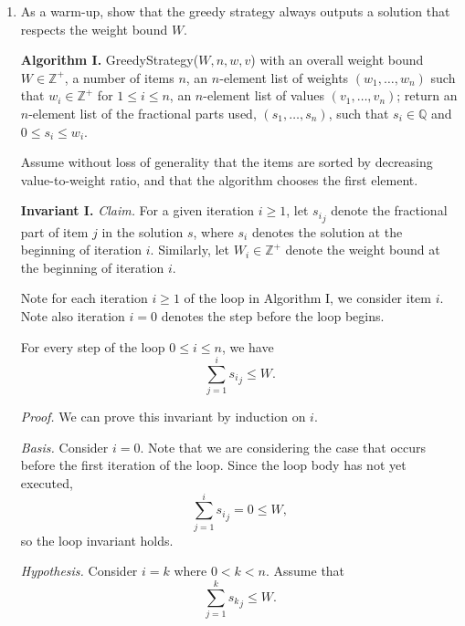 \begin{enumerate}
    \item As a warm-up, show that the greedy strategy always outputs a solution that respects the weight bound $W$.
\begin{solution}

\textbf{Algorithm I. }{\sc GreedyStrategy($W,n,w,v$)} with an overall weight bound $W\in\mathbb{Z}^+$, a number of items $n$, an $n$-element list of weights $(w_1,\dots,w_n)$ such that $w_i\in\mathbb{Z}^+$ for $1\leq i\leq n$, an $n$-element list of values $(v_1,\dots,v_n)$; return an $n$-element list of the fractional parts used, $(s_1,\dots,s_n)$, such that $s_i\in\mathbb{Q}$ and $0\leq s_i\leq w_i$. 

Assume without loss of generality that the items are sorted by decreasing value-to-weight ratio, and that the algorithm chooses the first element.

\textbf{Invariant I. }\textit{Claim. }For a given iteration $i\geq 1$, let ${s_i}_j$ denote the fractional part of item $j$ in the solution $s$, where $s_i$ denotes the solution at the beginning of iteration $i$. Similarly, let $W_i\in\mathbb{Z}^+$ denote the weight bound at the beginning of iteration $i$.

Note for each iteration $i\geq 1$ of the loop in Algorithm I, we consider item $i$. Note also iteration $i=0$ denotes the step before the loop begins. 

For every step of the loop $0\leq i\leq n$, we have \[\sum_{j=1}^i{{s_i}_j}\leq W.\] 

\textit{Proof. }We can prove this invariant by induction on $i$.

\textit{Basis. }Consider $i=0$. Note that we are considering the case that occurs before the first iteration of the loop. Since the loop body has not yet executed, \[\sum_{j=1}^i{{s_i}_j}=0\leq W,\] so the loop invariant holds.

\textit{Hypothesis. }Consider $i=k$ where $0<k<n$. Assume that \[\sum_{j=1}^k{{s_k}_j}\leq W.\]


\end{solution}
\end{enumerate}

